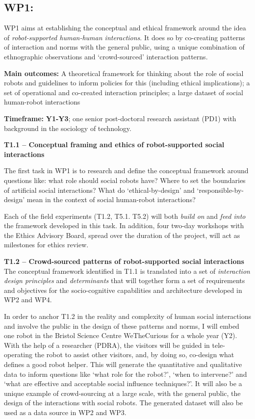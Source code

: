 \subsection{WP1: \textbf{\wpOne}}

WP1 aims at establishing the conceptual and ethical framework around the idea of
\emph{robot-supported human-human interactions}. It does so by co-creating
patterns of interaction and norms with the general public, using a unique
combination of ethnographic observations and `crowd-sourced' interaction
patterns.

\begin{framed}
    \textbf{Main outcomes:} A theoretical framework for thinking about the role of
    social robots and guidelines to inform policies for this (including ethical
    implications); a set of operational and co-created interaction principles; a
    large dataset of social human-robot interactions

    \textbf{Timeframe:} \textbf{Y1-Y3}; one senior post-doctoral research
    assistant (PD1) with background in the sociology of technology.
\end{framed}


\textbf{T1.1 -- Conceptual framing and ethics of robot-supported social
interactions}


The first task in WP1 is to research and define the conceptual framework around
questions like: what role should social robots have? Where
to set the boundaries of artificial social interactions? What do
`ethical-by-design' and `responsible-by-design' mean in the context of social
human-robot interactions? 

Each of the field experiments (T1.2, T5.1. T5.2) will both \emph{build on} and
\emph{feed into} the framework developed in this task. In addition, four
two-day workshops with the \project Ethics Advisory Board, spread over the
duration of the project, will act as milestones for ethics review.

\textbf{T1.2 -- Crowd-sourced patterns of robot-supported social
interactions} The conceptual framework identified in T1.1 is translated
into a set of \emph{interaction design principles} and \emph{determinants} that
will together form a set of requirements and objectives for the socio-cognitive
capabilities and architecture developed in WP2 and WP4.

In order to anchor T1.2 in the reality and complexity of human social
interactions and involve the public in the design of these patterns and norms, I
will embed one \project robot in the Bristol Science Centre WeTheCurious for a
whole year (Y2). With the help of a researcher (PDRA), the visitors will be guided in
tele-operating the robot to assist other visitors, and, by doing so, co-design
what defines a good robot helper. This will generate the quantitative and
qualitative data to inform questions like `what role for the robot?', `when to
intervene?' and `what are effective and acceptable social influence
techniques?'. It will also be a unique example of crowd-sourcing at a large
scale, with the general public, the design of the interactions with social
robots. The generated dataset will also be used as a data source in WP2 and
WP3.

